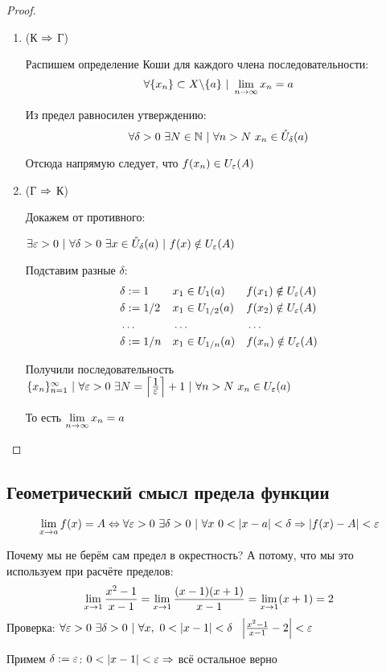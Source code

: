 \begin{proof}
	\begin{enumerate}
		\item (К $\Rightarrow$ Г)
		
		Распишем определение Коши для каждого члена последовательности: 
		$$
			\forall \{x_n\} \subset X \backslash \{a\}\ |\  \lim\limits_{n \rightarrow \infty} x_n = a
		$$
		
		Из предел равносилен утверждению: 
		$$
			\forall \delta > 0\ \exists N \in \N\ |\ \forall n > N\ x_n \in \mc{U}_{\delta}(a)
		$$
		
		Отсюда напрямую следует, что $f(x_n) \in U_{\varepsilon}(A)$
		
		\item (Г $\Rightarrow$ К)
		
		Докажем от противного:
		
		$\exists \varepsilon > 0\ |\ \forall \delta > 0\ \exists x \in \mathring{U}_{\delta}(a)\ |\ f(x) \notin U_{\varepsilon}(A)$
		
		Подставим разные $\delta$:
		\begin{align*}
			&\delta := 1 & &{x_1 \in U_{1}(a)} & &{f(x_1) \notin U_{\varepsilon}(A)}
			\\
			&\delta := 1/2 & &{x_1 \in U_{1/2}(a)} & &{f(x_2) \notin U_{\varepsilon}(A)}
			\\
			&\dots & &\dots & &\dots
			\\
			&\delta := 1/n & &{x_1 \in U_{1/n}(a)} & &{f(x_n) \notin U_{\varepsilon}(A)}
		\end{align*}
		
		Получили последовательность $\{x_n\}_{n = 1}^\infty\ |\ \forall \varepsilon > 0\ \exists N = \left\lceil\frac{\displaystyle 1}{\displaystyle \varepsilon}\right\rceil + 1\ |\ \forall n > N\ x_n \in U_{\varepsilon}(a)$
		
		То есть $\lim\limits_{n \rightarrow \infty} x_n = a$
	\end{enumerate}
\end{proof}

\subsection{Геометрический смысл предела функции}

$$
	\lim\limits_{x \rightarrow a} f(x) = A \Leftrightarrow \forall \varepsilon > 0\ \exists \delta > 0\ |\ \forall x\ 0 < |x - a| < \delta \Rightarrow |f(x) - A| < \varepsilon
$$


\begin{example}
	Почему мы не берём сам предел в окрестность? А потому, что мы это используем при расчёте пределов:
	$$
		\lim\limits_{x \rightarrow 1} \frac{x^2 - 1}{x - 1} = \lim\limits_{x \rightarrow 1} \frac{(x - 1)(x + 1)}{x - 1} = \lim\limits_{x \rightarrow 1} (x + 1) = 2
	$$
	Проверка:
	$\forall \eps > 0\ \exists \delta > 0\ |\ \forall x,\ 0 < |x - 1| < \delta\ \ \left|\frac{x^2 - 1}{x - 1} - 2\right| < \eps$
	
	Примем $\delta := \varepsilon$: $0 < |x - 1| < \varepsilon \Rightarrow $ всё остальное верно
\end{example}

